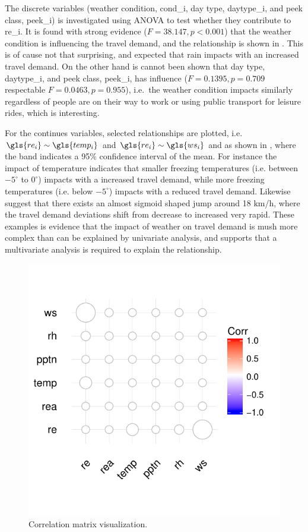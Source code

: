 The discrete variables (weather condition, \gls{cond_i}, day type, \gls{daytype_i}, and peek class, \gls{peek_i}) is investigated using ANOVA to test whether they contribute to \gls{re_i}. It is found with strong evidence ($F = 38.147, p < 0.001$) that the weather condition is influencing the travel demand, and the relationship is shown in . This is of cause not that surprising, and expected that rain impacts with an increased travel demand. On the other hand is cannot been shown that day type, \gls{daytype_i}, and peek class, \gls{peek_i}, has influence ($F =  0.1395, p = 0.709$ respectable $F =  0.0463, p = 0.955$), i.e.\ the weather condition impacts similarly regardless of people are on their way to work or using public transport for leisure rides, which is interesting.

For the continues variables, selected relationships are plotted, i.e.\ $\gls{re_i} \sim \gls{temp_i}$ and $\gls{re_i} \sim \gls{ws_i}$ and as shown in , where the band indicates a 95\% confidence interval of the mean. For instance the impact of temperature indicates that smaller freezing temperatures (i.e. between $-5^{\circ}$ to $0^{\circ}$) impacts with a increased travel demand, while more freezing temperatures (i.e. below $-5^{\circ}$) impacts with a reduced travel demand. Likewise  suggest that there exists an almost sigmoid shaped jump around 18 km/h, where the travel demand deviations shift from decrease to increased very rapid. These examples is evidence that the impact of weather on travel demand is mush more complex than can be explained by univariate analysis, and supports that a multivariate analysis is required to explain the relationship.
\vspace{-3em}
\begin{figure}[!ht]
    \center
    \includegraphics{../plots/cor_matrix}
    \vspace{-2em}
    \caption{Correlation matrix visualization.}
    \label{fig:cor_matrix}
\end{figure}
